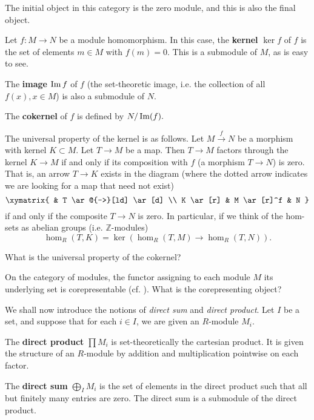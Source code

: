 \begin{exercise} 
The initial object in this category is the zero module, and this is also the
final object. 
\end{exercise} 
\begin{definition} Let $f: M \to N$ be a module homomorphism.
In this case, the \textbf{kernel} $\ker f$ of $f$ is  the set of elements $m
\in M$ with $f(m)=0$. This is
a submodule of $M$, as is easy to see. 

The \textbf{image} $\operatorname{Im} f$ of $f$ (the set-theoretic
image, i.e. the collection of all $f(x), x \in M$) is also a submodule of $N$. 

The
\textbf{cokernel} of $f$ is defined by
\(  N/\operatorname{Im}(f).  \) 
\end{definition}

\begin{exercise} \label{univpropertykernel} 
The universal property of the kernel is as follows. Let $M \stackrel{f}{\to }
N$ be a morphism with kernel $K \subset M$. Let $T \to M$ be a map. Then $T \to M$ factors through the
kernel $K \to M$ if and only if its composition with $f$ (a morphism $T \to N$) is zero. 
That is, an arrow $T \to K$ exists in the diagram (where the dotted arrow
indicates we are looking for a map that need not exist)
\[ \xymatrix{
& T \ar@{-->}[ld] \ar[d]  \\
K \ar[r] &  M \ar[r]^f &  N
}\]
if and only if the composite $T \to N$ is zero.
In particular, if we think of the hom-sets as abelian groups (i.e.
$\mathbb{Z}$-modules)
\[ \hom_R( T,K) = \ker\left( \hom_R(T, M) \to \hom_R(T, N) \right). \]
\end{exercise} 
\begin{exercise} 
What is the universal property of the cokernel?
\end{exercise} 

\begin{exercise} \label{moduleunderlyingsetrepresentable}
On the category of modules, the functor assigning to each module $M$ its
underlying set is corepresentable (cf. ). What
is the corepresenting object? 
\end{exercise} 

We shall now introduce the notions of \emph{direct sum} and \emph{direct
product}. Let $I$ be a set, and suppose that for each $i \in I$, we are given
an $R$-module $M_i$.

\begin{definition} 
The \textbf{direct product} $\prod M_i$ is set-theoretically the cartesian product. It is given
the structure of an $R$-module by addition and multiplication pointwise on
each factor. 
\end{definition} 
\begin{definition} 
The \textbf{direct sum} $\bigoplus_I M_i$ is the set of elements in the direct
product such that all but finitely many entries are zero. The direct sum is a
submodule of the direct product.
\end{definition} 


